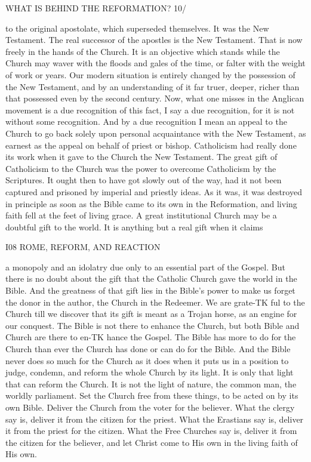 \documentclass[12pt,a5paper,oneside]{book}
\begin{document}
WHAT IS BEHIND THE REFORMATION? 10/ 

to the original apostolate, which superseded themselves. 
It was the New Testament. The real successor of the 
apostles is the New Testament. That is now freely in 
the hands of the Church. It is an objective which 
stands while the Church may waver with the floods 
and gales of the time, or falter with the weight of 
work or years. Our modern situation is entirely 
changed by the possession of the New Testament, 
and by an understanding of it far truer, deeper, richer 
than that possessed even by the second century. 
Now, what one misses in the Anglican movement is a 
due recognition of this fact, I say a due recognition, 
for it is not without some recognition. And by a due 
recognition I mean an appeal to the Church to go 
back solely upon personal acquaintance with the New 
Testament, as earnest as the appeal on behalf of priest 
or bishop. Catholicism had really done its work 
when it gave to the Church the New Testament. The 
great gift of Catholicism to the Church was the power 
to overcome Catholicism by the Scriptures. It ought 
then to have got slowly out of the way, had it not been 
captured and prisoned by imperial and priestly ideas. 
As it was, it was destroyed in principle as soon as 
the Bible came to its own in the Reformation, and 
living faith fell at the feet of living grace. A great 
institutional Church may be a doubtful gift to the 
world. It is anything but a real gift when it claims 



I08 ROME, REFORM, AND REACTION 

a monopoly and an idolatry due only to an essential 
part of the Gospel. But there is no doubt about the 
gift that the Catholic Church gave the world in the 
Bible. And the greatness of that gift lies in the 
Bible's power to make us forget the donor in the 
author, the Church in the Redeemer. We are grate-TK
ful to the Church till we discover that its gift is 
meant as a Trojan horse, as an engine for our 
conquest. The Bible is not there to enhance the 
Church, but both Bible and Church are there to en-TK
hance the Gospel. The Bible has more to do for the 
Church than ever the Church has done or can do for 
the Bible. And the Bible never does so much for the 
Church as it does when it puts us in a position to 
judge, condemn, and reform the whole Church by 
its light. It is only that light that can reform the 
Church. It is not the light of nature, the common 
man, the worldly parliament. Set the Church free 
from these things, to be acted on by its own Bible. 
Deliver the Church from the voter for the believer. 
What the clergy say is, deliver it from the citizen for 
the priest. What the Erastians say is, deliver it from 
the priest for the citizen. What the Free Churches 
say is, deliver it from the citizen for the believer, and 
let Christ come to His own in the living faith of 
His own. 
\end{document}
